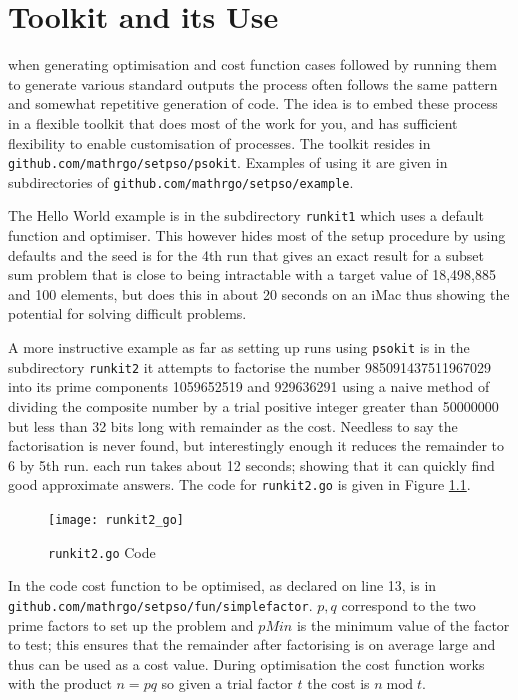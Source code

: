 \documentclass[a4paper,oneside,english]{book}
\numberwithin{equation}{section}
\numberwithin{figure}{section}
\newcommand{\codesorc}[1]{\texttt{github.com/mathrgo/setpso/#1}}
\begin{document}
\chapter{Toolkit and its Use}

when generating optimisation and cost function cases followed by running them to generate various standard outputs the process often follows the same pattern and somewhat repetitive generation of code. The idea is to embed these process in a flexible toolkit that does most of the work for you, and has sufficient flexibility to enable customisation of processes. The toolkit resides in \codesorc{psokit}.
Examples of using it are given in subdirectories of \codesorc{example}. 

The Hello World  example is in the subdirectory
\texttt{runkit1} which uses a default function and optimiser. This however hides most of the setup procedure by using defaults and the seed is for the 4th run that gives an exact result for a subset sum problem that is close to being intractable with a target value of 18,498,885  and 100 elements, but does this in about 20 seconds on an iMac thus showing the potential for solving difficult problems. 

A more instructive example as far as setting up runs using \texttt{psokit}  is in the subdirectory \texttt{runkit2} it attempts to factorise the number 985091437511967029 into its prime components 1059652519 and 929636291 using a naive method of dividing the composite number by a trial positive integer  greater than 50000000 but less than 32  bits long with  remainder as the cost. Needless to say the factorisation is never found, but interestingly enough it reduces the remainder to 6 by 5th run. each run takes about 12 seconds; showing that it can quickly find good approximate answers.  The  code for \texttt{runkit2.go} is  given in Figure \ref{fig:runkit2go}.


\begin{figure}
	\centering
	\texttt{[image: runkit2\_go]}
	\caption{\texttt{runkit2.go} Code}
	\label{fig:runkit2go}
\end{figure}

In the code  cost function to be optimised, as declared on line 13, is in
\codesorc{fun/simplefactor}. $p,q$ correspond to the two prime factors to set up the problem and $pMin$ is the minimum value of the factor to test; this ensures that the remainder after factorising is on average large and thus can be used as a cost value. During optimisation the cost function works with the product $n = pq$ so given a trial factor $t$ the cost is $n\; \mathrm{mod}\; t$.    
\end{document}
